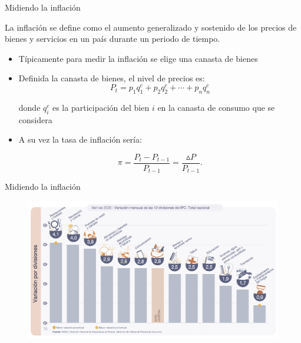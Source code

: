 \documentclass{beamer}
\begin{document}
\begin{frame}{Midiendo la inflación}
\begin{boxB}
\centering
    La inflación se define como el aumento generalizado y sostenido de los precios de bienes y servicios en un país durante un periodo de tiempo.
\end{boxB}
\begin{itemize}    
    \item Típicamente para medir la inflación se elige una canasta de bienes \vspace{1mm}
    \item Definida la canasta de bienes, el nivel de precios es: 
        \begin{equation*}
            P_t = p_1 q_1^c+ p_2 q_2^c+\cdots+p_n q_n^c
        \end{equation*}

    donde $q_i^c$ es la participación del bien $i$ en la canasta de consumo que se considera

    \item A su vez la tasa de inflación sería: 

    \begin{equation*}
        \pi =\frac{P_t - P_{t-1}}{P_{t-1}}= \frac{\vartriangle P}{P_{t-1}}.
    \end{equation*}
\end{itemize}
\end{frame}

\begin{frame}{Midiendo la inflación}
\begin{figure} [H]  
\includegraphics[scale=0.17]{../Figures/IPC_2025.jpg}
\end{figure}
\end{frame}
\end{document}
